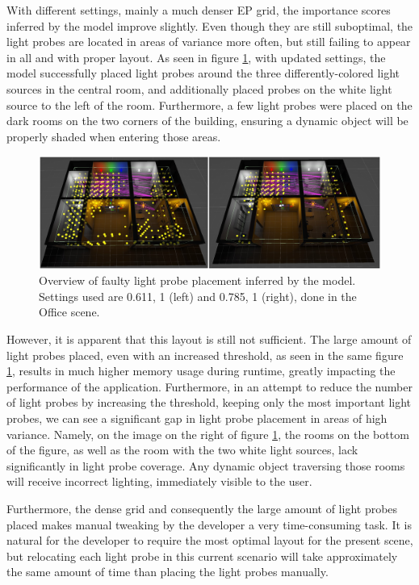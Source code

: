 With different settings, mainly a much denser EP grid, the importance scores inferred by the model improve slightly. Even though they are still suboptimal, the light probes are located in areas of variance more often, but still failing to appear in all and with proper layout. As seen in figure \ref{fig:office_faulty_new}, with updated settings, the model successfully placed light probes around the three differently-colored light sources in the central room, and additionally placed probes on the white light source to the left of the room. Furthermore, a few light probes were placed on the dark rooms on the two corners of the building, ensuring a dynamic object will be properly shaded when entering those areas.

\begin{figure}[h]
	\centering
	\includegraphics[width=\linewidth]{Graphics/results/concats/comparison9.png}
	\caption{Overview of faulty light probe placement inferred by the model. Settings used are 0.611, 1 (left) and 0.785, 1 (right), done in the Office scene.}
	\label{fig:office_faulty_new}
\end{figure}

However, it is apparent that this layout is still not sufficient. The large amount of light probes placed, even with an increased threshold, as seen in the same figure \ref{fig:office_faulty_new}, results in much higher memory usage during runtime, greatly impacting the performance of the application. Furthermore, in an attempt to reduce the number of light probes by increasing the threshold, keeping only the most important light probes, we can see a significant gap in light probe placement in areas of high variance. Namely, on the image on the right of figure \ref{fig:office_faulty_new}, the rooms on the bottom of the figure, as well as the room with the two white light sources, lack significantly in light probe coverage. Any dynamic object traversing those rooms will receive incorrect lighting, immediately visible to the user. 

Furthermore, the dense grid and consequently the large amount of light probes placed makes manual tweaking by the developer a very time-consuming task. It is natural for the developer to require the most optimal layout for the present scene, but relocating each light probe in this current scenario will take approximately the same amount of time than placing the light probes manually.\newline

